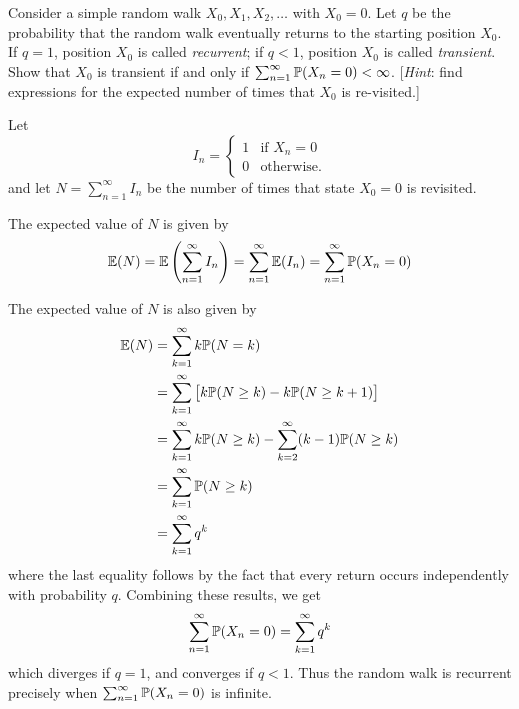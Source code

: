 \begin{exercise}
Consider a simple random walk $X_0,X_1,X_2,\ldots$ with $X_0=0$. Let $q$ be the probability that the random walk eventually returns to the starting position $X_0$. If $q=1$, position $X_0$ is called \emph{recurrent}; if $q<1$, position $X_0$ is called \emph{transient}. Show that $X_0$ is transient if and only if $\sum_{n=1}^{\infty} \mathbb{P}(X_n = 0) < \infty$. [\textit{Hint}: find expressions for the expected number of times that $X_0$ is re-visited.]
\begin{answer}
Let 
\[
I_n = \begin{cases}
1 & \text{if } X_n = 0 \\
0 & \text{otherwise.}
\end{cases}
\]
and let $N = \sum_{n=1}^{\infty} I_n$ be the number of times that state $X_0=0$ is revisited.

The expected value of $N$ is given by
\[
\mathbb{E}(N) 
	= \mathbb{E}\left(\sum_{n=1}^{\infty} I_n\right) 
	= \sum_{n=1}^{\infty} \mathbb{E}(I_n)
	= \sum_{n=1}^{\infty} \mathbb{P}(X_n = 0)
\]

The expected value of $N$ is also given by
\begin{align*}
\mathbb{E}(N)
	& = \sum_{k=1}^{\infty} k\mathbb{P}(N=k) \\
	& = \sum_{k=1}^{\infty} \big[ k\mathbb{P}(N\geq k) - k\mathbb{P}(N\geq k+1)\big] \\
	& = \sum_{k=1}^{\infty} k\mathbb{P}(N\geq k) - \sum_{k=2}^{\infty} (k-1)\mathbb{P}(N\geq k) \\
	& = \sum_{k=1}^{\infty} \mathbb{P}(N\geq k) \\
	& = \sum_{k=1}^{\infty} q^k 
\end{align*}
where the last equality follows by the fact that every return occurs independently with probability $q$. Combining these results, we get
\[
\sum_{n=1}^{\infty}\mathbb{P}(X_n=0) = \sum_{k=1}^{\infty} q^k
\]
which diverges if $q=1$, and converges if $q<1$. Thus the random walk is recurrent precisely when $\sum_{n=1}^{\infty} \mathbb{P}(X_n = 0)$ is infinite.
\end{answer}
\end{exercise}

